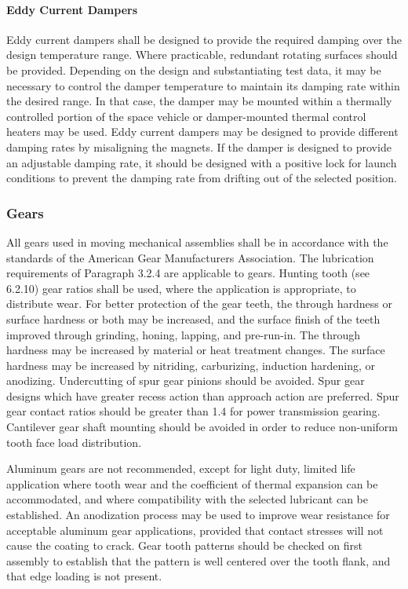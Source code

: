 \documentclass[12pt]{article}
\begin{document}
\paragraph{Eddy Current Dampers} %
Eddy current dampers shall be designed to provide the required damping over the design temperature range. 
Where practicable, redundant rotating surfaces should be provided. 
Depending on the design and substantiating test data, it may be necessary to control the damper temperature to maintain its damping rate within the desired range. 
In that case, the damper may be mounted within a thermally controlled portion of the space vehicle or damper-mounted thermal control heaters may be used. 
Eddy current dampers may be designed to provide different damping rates by misaligning the magnets. 
If the damper is designed to provide an adjustable damping rate, it should be designed with a positive lock for launch conditions to prevent the damping rate from drifting out of the selected position.

\subsubsection{Gears} %
All gears used in moving mechanical assemblies shall be in accordance with the standards of the American Gear Manufacturers Association. 
The lubrication requirements of Paragraph 3.2.4 are applicable to gears.
Hunting tooth (see 6.2.10) gear ratios shall be used, where the application is appropriate, to distribute wear. 
For better protection of the gear teeth, the through hardness or surface hardness or both may be increased, and the surface finish of the teeth improved through grinding, honing, lapping, and pre-run-in. 
The through hardness may be increased by material or heat treatment changes. 
The surface hardness may be increased by nitriding, carburizing, induction hardening, or anodizing. 
Undercutting of spur gear pinions should be avoided. 
Spur gear designs which have greater recess action than approach action are preferred. 
Spur gear contact ratios should be greater than 1.4 for power transmission gearing.
Cantilever gear shaft mounting should be avoided in order to reduce non-uniform tooth face load distribution.

Aluminum gears are not recommended, except for light duty, limited life application where tooth wear and the coefficient of thermal expansion can be accommodated, and where compatibility with the selected lubricant can be established. 
An anodization process may be used to improve wear resistance for acceptable aluminum gear applications, provided that contact stresses will not cause the coating to crack. 
Gear tooth patterns should be checked on first assembly to establish that the pattern is well centered over the tooth flank, and that edge loading is not present.
\end{document}
